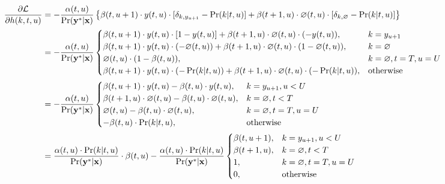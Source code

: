 \documentclass{article}
\begin{document}
\begin{equation} \label{eq:grad_acts}
    \begin{split}
        \frac{\partial \mathcal L}{\partial h(k,t,u)} &= 
            -\frac{\alpha(t,u)}{\Pr(\mathbf{y}^*|\mathbf{x})} \left \{ \beta(t, u+1) \cdot y(t,u) \cdot [\delta_{k,y_{u+1}} - \Pr(k|t,u)] + 
                \beta(t+1, u) \cdot \varnothing(t,u) \cdot [\delta_{k,\varnothing} - \Pr(k|t,u)] \right \} \\
        &= -\frac{\alpha(t,u)}{\Pr(\mathbf{y}^*|\mathbf{x})} 
            \begin{cases}
                \beta(t, u+1) \cdot y(t,u) \cdot [1 - y(t,u)] + \beta(t+1, u) \cdot \varnothing(t,u) \cdot (-y(t,u)), & k = y_{u+1} \\
                \beta(t, u+1) \cdot y(t,u) \cdot (-\varnothing(t,u)) + \beta(t+1, u) \cdot \varnothing(t,u) \cdot (1 - \varnothing(t,u)), & k = \varnothing \\
                \varnothing(t,u) \cdot (1 - \beta(t,u)), & k = \varnothing, t = T, u = U \\
                \beta(t, u+1) \cdot y(t,u) \cdot (-\Pr(k|t,u)) + \beta(t+1, u) \cdot \varnothing(t,u) \cdot (-\Pr(k|t,u)), & \text{otherwise}
            \end{cases} \\
        &= -\frac{\alpha(t,u)}{\Pr(\mathbf{y}^*|\mathbf{x})}
            \begin{cases}
                \beta(t, u+1) \cdot y(t,u) - \beta(t, u) \cdot y(t,u), & k = y_{u+1}, u < U \\
                \beta(t+1, u) \cdot \varnothing(t,u) - \beta(t, u) \cdot \varnothing(t,u), & k = \varnothing, t < T \\
                \varnothing(t,u) - \beta(t, u) \cdot \varnothing(t,u), & k = \varnothing, t = T, u = U \\
                -\beta(t, u) \cdot \Pr(k|t,u), & \text{otherwise} \\
            \end{cases} \\
        &= \frac{\alpha(t,u) \cdot \Pr(k|t,u)}{\Pr(\mathbf{y}^*|\mathbf{x})} \cdot \beta(t,u) - \frac{\alpha(t,u) \cdot \Pr(k|t,u)}{\Pr(\mathbf{y}^*|\mathbf{x})}
            \begin{cases}
                \beta(t, u+1), & k = y_{u+1}, u < U \\
                \beta(t+1, u), & k = \varnothing, t < T \\
                1, & k = \varnothing, t = T, u = U \\
                0, & \text{otherwise} \\
            \end{cases}
    \end{split}
\end{equation}
\end{document}
